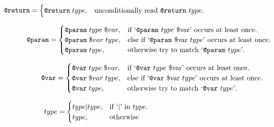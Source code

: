 \documentclass[../main.tex]{subfiles}
\begin{document}
\begin{equation}\label{eq:return}
  \begin{aligned}
  \texttt{@return}=\begin{cases}
    \texttt{@return} \; type, & \text{unconditionally read \texttt{@return} $type$}.\\
  \end{cases}
  \end{aligned}
  \phantom{\hspace{8cm}} %
\end{equation}

\begin{equation}\label{eq:param}
  \begin{aligned}
  \texttt{@param}=\begin{cases}
    \texttt{@param} \; type \; \$var, & \text{if `\texttt{@param} $type$ \$var' occurs at least once}.\\
    \texttt{@param} \; \$var \; type, & \text{else if `\texttt{@param} \$var $type$' occurs at least once}.\\
    \texttt{@param} \; type, & \text{otherwise try to match `\texttt{@param} $type$'}.\\
  \end{cases}
  \end{aligned}
  \phantom{\hspace{3.55cm}} %
\end{equation}

\begin{equation}\label{eq:var}
  \begin{aligned}
  \texttt{@var}=\begin{cases}
    \texttt{@var} \; type \; \$var, & \text{if `\texttt{@var} $type$ \$var' occurs at least once}.\\
    \texttt{@var} \; \$var \; type, & \text{else if `\texttt{@var} \$var $type$' occurs at least once}.\\
    \texttt{@var} \; type, & \text{otherwise try to match `\texttt{@var} $type$'}.\\
  \end{cases}
  \end{aligned}
  \phantom{\hspace{3.2cm}} %
\end{equation}

\begin{equation}\label{eq:type}
  \begin{aligned}
  type=\begin{cases}
    type|type, & \text{if `$\vert$' in $type$}.\\
    type, & \text{otherwise}
  \end{cases}
  \end{aligned}
  \phantom{\hspace{8.8cm}} %
\end{equation}
\end{document}
